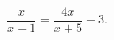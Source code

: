\begin{ex}[type=equation]
	\begin{condition}
		$\dfrac{x}{x - 1} = \dfrac{4x}{x + 5} - 3.$
	\end{condition}
\end{ex}